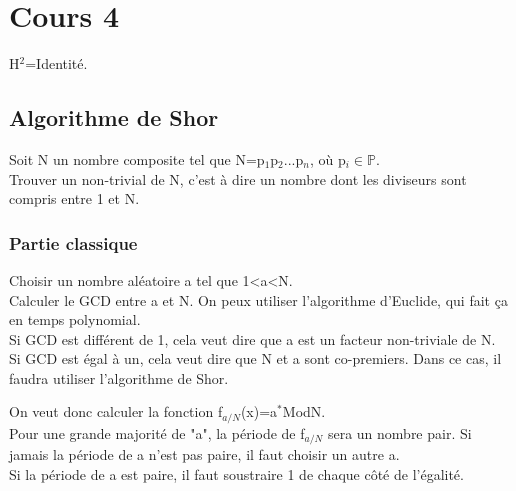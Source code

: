 \section{Cours 4}
H$^2$=Identité.
\subsection{Algorithme de Shor}
Soit N un nombre composite tel que N=p$_1$p$_2$...p$_n$, où p$_i\in\mathbb{P}$.\\
Trouver un non-trivial de N, c'est à dire un nombre dont les diviseurs sont compris entre 1 et N.
\subsubsection{Partie classique}
Choisir un nombre aléatoire a tel que 1<a<N.\\
Calculer le GCD entre a et N. On peux utiliser l'algorithme d'Euclide, qui fait ça en temps polynomial.\\
Si GCD est différent de 1, cela veut dire que a est un facteur non-triviale de N.\\
Si GCD est égal à un, cela veut dire que N et a sont co-premiers. Dans ce cas, il faudra utiliser l'algorithme de Shor.

On veut donc calculer la fonction f$_{a/N}$(x)=a$^*$ModN.\\
Pour une grande majorité de "a", la période de f$_{a/N}$ sera un  nombre pair. Si jamais la période de a n'est pas 
paire, il faut choisir un autre a.\\
Si la période de a est paire, il faut soustraire 1 de chaque côté de l'égalité.

